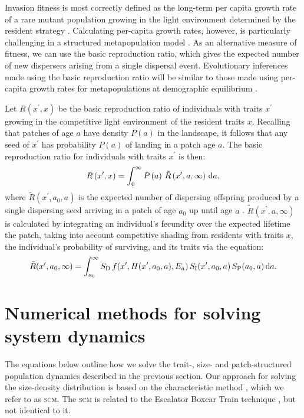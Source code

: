 \documentclass[10pt,twoside]{article}
\begin{document}
Invasion fitness is most correctly defined as the long-term per capita
growth rate of a rare mutant population growing in the light environment
determined by the resident strategy \citep{Metz-1992}. Calculating
per-capita growth rates, however, is particularly challenging in a
structured metapopulation model \citep{Gyllenberg-2001, Metz-2001}. As
an alternative measure of fitness, we can use the basic reproduction
ratio, which gives the expected number of new dispersers arising from a
single dispersal event. Evolutionary inferences made using the basic
reproduction ratio will be similar to those made using per-capita growth
rates for metapopulations at demographic equilibrium
\citep{Gyllenberg-2001, Metz-2001}.

Let \(R\left(x^\prime, x\right)\) be the basic reproduction ratio of
individuals with traits \(x^\prime\) growing in the competitive
light environment of the resident traits \(x\). Recalling that patches of age
\(a\) have density \(P(a)\) in the landscape, it follows that any seed
of \(x^\prime\) has probability \(P(a)\) of landing in a patch age
\(a\). The basic reproduction ratio for individuals with traits
\(x^\prime\) is then:
\begin{equation} \label{eq:InvFit}
  R\left(x^\prime,x\right) = \int _0^{\infty} P\left(a\right) \, \tilde{R}\left(x^\prime, a, \infty \right) \, {\rm d}a ,
\end{equation}
where \(\tilde{R}\left(x^\prime, a_0, a \right)\) is the expected number
of dispersing offspring produced by a single dispersing seed arriving in
a patch of age \(a_0\) up until age \(a\)
\citep{Gyllenberg-2001, Metz-2001}.
\(\tilde{R}\left(x^\prime, a,\infty\right)\) is calculated by integrating
an individual's fecundity over the expected lifetime the patch, taking
into account competitive shading from residents with traits \(x\), the
individual's probability of surviving, and its traits via the equation:
\begin{equation} \label{eq:tildeR}
  \tilde{R}(x^\prime, a_0, \infty) = \int_{a_0}^{\infty}  S_{\rm D} \, f(x^\prime, H(x^\prime, a_0, a), E_{a}) \, S_{\rm I} (x^\prime, a_0, a) \, S_{\rm P} (a_0, a) \, {\rm d} a.
\end{equation}

\section{Numerical methods for solving system dynamics}

The equations below outline how we solve the trait-, size- and patch-structured
population dynamics described in the previous section.
Our approach for solving the size-density distribution is based on the characteristic method \citep{Angulo-2004}, which we refer to as \textsc{scm}. The \textsc{scm} is related to
the Escalator Boxcar Train technique
\citep{Deroos-1988, Deroos-1997, Deroos-1992}, but not identical to it.
\end{document}
